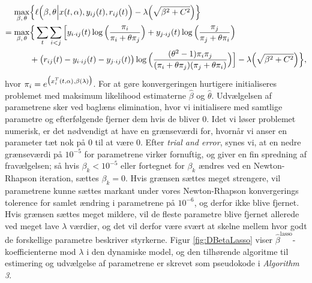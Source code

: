 \documentclass[11pt,a4paper]{article}
\begin{document}
\begin{align*}
\max_{\beta,\,\theta} &\Big{\{}\ell\Big{(}\beta,\theta\Big{|}x(t,\alpha),y_{ij}(t),r_{ij}(t)\Big{)}-\lambda \Big{(}\sqrt{\beta^2+C^2}\Big{)}\Big{\}}\\
=\max_{\beta,\,\theta} 
&\Big{\{}\sum_{t}\sum_{i<j}\Big{[}y_{i\cdot ij}(t)\log\Big{(}\frac{\pi_i}{\pi_i+\theta\pi_j}\Big{)}
+ y_{j\cdot ij}(t)\log\Big{(}\frac{\pi_j}{\pi_j+\theta\pi_i}\Big{)}\\
&+ \big{(}r_{ij}(t)-y_{i\cdot ij}(t)-y_{j\cdot ij}(t)\big{)} \log\Big{(}\frac{(\theta^2-1)\pi_i \pi_j}{(\pi_i+\theta\pi_j)(\pi_j+\theta\pi_i)}\Big{)}\Big{]}-\lambda \Big{(}\sqrt{\beta^2+C^2}\Big{)}\Big{\}},
\end{align*}
hvor $\pi_i=e^{\big{(}x_i^T(t,\alpha),\beta(\lambda)\big{)}}$. For at gøre konvergeringen hurtigere initialiseres problemet med maksimum likelihood estimaterne $\hat{\beta}$ og $\hat{\theta}$. Udvælgelsen af parametrene sker ved baglæns elimination, hvor vi initialisere med samtlige parametre og efterfølgende fjerner dem hvis de bliver 0. Idet vi løser problemet numerisk, er det nødvendigt at have en grænseværdi for, hvornår vi anser en parameter tæt nok på 0 til at være 0. Efter \textit{trial and error}, synes vi, at en nedre grænseværdi på $10^{-5}$ for parametrene virker fornuftig, og giver en fin spredning af fravælgelsen; så hvis $\beta_k<10^{-5}$ eller fortegnet for $\beta_k$ ændres ved en Newton-Rhapson iteration, sættes $\beta_k=0$. Hvis grænsen sættes meget strengere, vil parametrene kunne sættes markant under vores Newton-Rhapson konvergerings tolerence for samlet ændring i parametrene på $10^{-6}$, og derfor ikke blive fjernet. Hvis grænsen sættes meget mildere, vil de fleste parametre blive fjernet allerede ved meget lave $\lambda$ værdier, og det vil derfor være svært at skelne mellem hvor godt de forskellige parametre beskriver styrkerne. Figur \ref{fig:DBetaLasso} viser $\hat{\beta}^{\text{lasso}}$-koefficienterne mod $\lambda$ i den dynamiske model, og den tilhørende algoritme til estimering og udvælgelse af parametrene er skrevet som pseudokode i \textit{Algorithm 3}.\\
\end{document}
